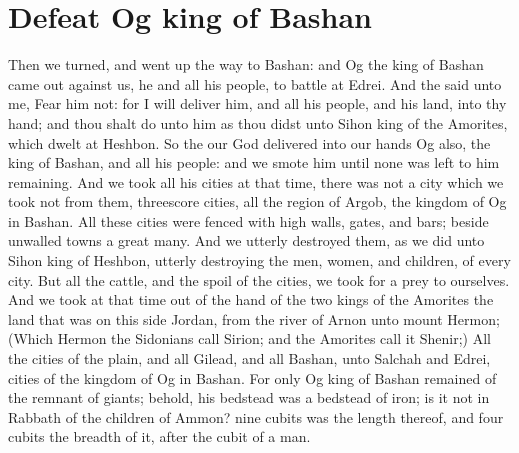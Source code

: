 \section*{Defeat Og king of Bashan}
\begin{biblechapter} %
\verse Then we turned, and went up the way to Bashan: and Og the king of Bashan came out against us, he and all his people, to battle at Edrei.
\verse And the \LORD said unto me, Fear him not: for I will deliver him, and all his people, and his land, into thy hand; and thou shalt do unto him as thou didst unto Sihon king of the Amorites, which dwelt at Heshbon.
\verse So the \LORD our God delivered into our hands Og also, the king of Bashan, and all his people: and we smote him until none was left to him remaining.
\verse And we took all his cities at that time, there was not a city which we took not from them, threescore cities, all the region of Argob, the kingdom of Og in Bashan.
\verse All these cities were fenced with high walls, gates, and bars; beside unwalled towns a great many.
\verse And we utterly destroyed them, as we did unto Sihon king of Heshbon, utterly destroying the men, women, and children, of every city.
\verse But all the cattle, and the spoil of the cities, we took for a prey to ourselves.
\verse And we took at that time out of the hand of the two kings of the Amorites the land that was on this side Jordan, from the river of Arnon unto mount Hermon;
\verse (Which Hermon the Sidonians call Sirion; and the Amorites call it Shenir;)
\verse All the cities of the plain, and all Gilead, and all Bashan, unto Salchah and Edrei, cities of the kingdom of Og in Bashan.
\verse For only Og king of Bashan remained of the remnant of giants; behold, his bedstead was a bedstead of iron; is it not in Rabbath of the children of Ammon? nine cubits was the length thereof, and four cubits the breadth of it, after the cubit of a man.

\end{biblechapter}
